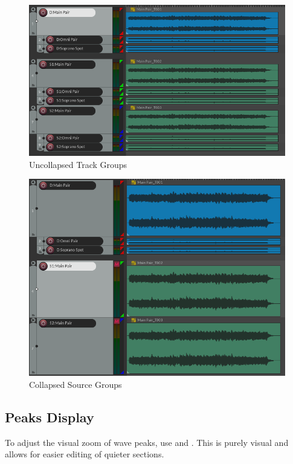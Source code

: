 \documentclass[10pt,american]{article}
\begin{document}
\begin{figure}
\includegraphics[width=1\linewidth]{user_guide_images/uncollapsed}

\caption{Uncollapsed Track Groups}

\end{figure}

\begin{figure}
\includegraphics[width=1\linewidth]{user_guide_images/collapsed}

\caption{Collapsed Source Groups}

\end{figure}


\subsection{Peaks Display}

To adjust the visual zoom of wave peaks, use \keys{\ctrl+\arrowkeyup} and
\keys{\ctrl+\arrowkeydown} . This is purely visual and allows for easier editing
of quieter sections.
\end{document}
